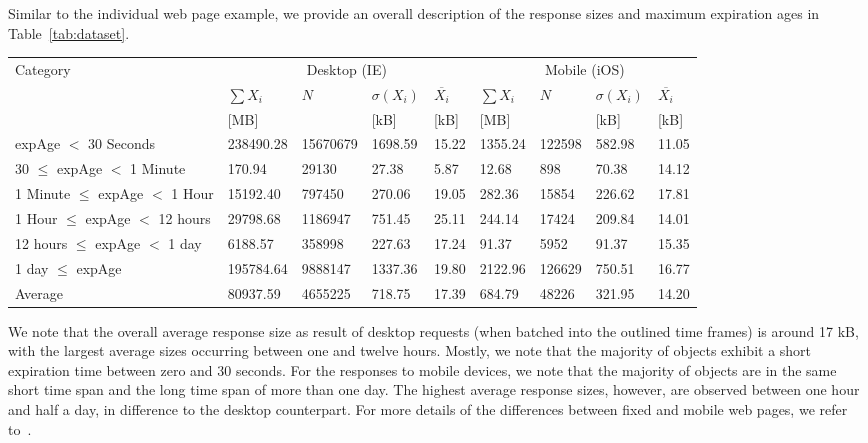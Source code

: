 Similar to the individual web page example, we provide an overall description of the response sizes and maximum expiration ages in Table~\ref{tab:dataset}.
\begin{table*}
\small
\centering
\caption{Overview of the large dataset characteristics for all pages and response objects with a focus on the cache lifetime.}
\label{tab:dataset}
\begin{tabularx}{\columnwidth}{|X||X|X|X|X||X|X|X|X|}

	\hline
	Category                         & \multicolumn{4}{|c||}{Desktop (IE)}                       & \multicolumn{4}{|c|}{Mobile (iOS)}                      \\
	                                 & $\sum X_i $ &   $N$    & $\sigma(X_i)$ & $\overline{X_i}$ & $\sum X_i $ &  $N$   & $\sigma(X_i)$ & $\overline{X_i}$ \\
	                                 &    [MB]     &          &     [kB]      &       [kB]       &    [MB]     &        &     [kB]      &       [kB]       \\ \hline\hline
	expAge $<$ 30 Seconds            &  238490.28  & 15670679 &    1698.59    &      15.22       &   1355.24   & 122598 &    582.98     &      11.05       \\ \hline
	30 $\le$ expAge $<$ 1 Minute     &   170.94    &  29130   &     27.38     &       5.87       &    12.68    &  898   &     70.38     &      14.12       \\ \hline
	1 Minute $\le$ expAge $<$ 1 Hour &  15192.40   &  797450  &    270.06     &      19.05       &   282.36    & 15854  &    226.62     &      17.81       \\ \hline
	1 Hour $\le$ expAge $<$ 12 hours &  29798.68   & 1186947  &    751.45     &      25.11       &   244.14    & 17424  &    209.84     &      14.01       \\ \hline
	12 hours $\le$ expAge $<$ 1 day  &   6188.57   &  358998  &    227.63     &      17.24       &    91.37    &  5952  &     91.37     &      15.35       \\ \hline
	1 day $\le$ expAge               &  195784.64  & 9888147  &    1337.36    &      19.80       &   2122.96   & 126629 &    750.51     &      16.77       \\ \hline\hline
	Average                          &  80937.59   & 4655225  &    718.75     &      17.39       &   684.79    & 48226  &    321.95     &      14.20       \\ \hline
\end{tabularx}
\end{table*}
We note that the overall average response size as result of desktop requests (when batched into the outlined time frames) is around 17 kB, with the largest average sizes occurring between one and twelve hours.
Mostly, we note that the majority of objects exhibit a short expiration time between zero and 30 seconds.
For the responses to mobile devices, we note that the majority of objects are in the same short time span and the long time span of more than one day.
The highest average response sizes, however, are observed between one hour and half a day, in difference to the desktop counterpart.
For more details of the differences between fixed and mobile web pages, we refer to~\cite{JoSe14Commag}.

